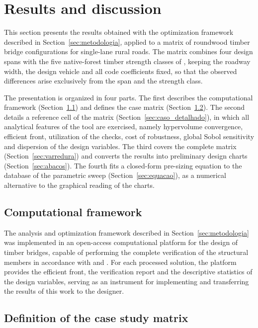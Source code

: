 \section{Results and discussion}\label{sec:resultados}

This section presents the results obtained with the optimization framework described in Section~\ref{sec:metodologia}, applied to a matrix of roundwood timber bridge configurations for single-lane rural roads.
The matrix combines four design spans with the five native-forest timber strength classes of \textcite{NBR7190-1:2022}, keeping the roadway width, the design vehicle and all code coefficients fixed, so that the observed differences arise exclusively from the span and the strength class.

The presentation is organized in four parts.
The first describes the computational framework (Section~\ref{sec:plataforma}) and defines the case matrix (Section~\ref{sec:casos}).
The second details a reference cell of the matrix (Section~\ref{sec:caso_detalhado}), in which all analytical features of the tool are exercised, namely hypervolume convergence, efficient front, utilization of the checks, cost of robustness, global Sobol sensitivity and dispersion of the design variables.
The third covers the complete matrix (Section~\ref{sec:varredura}) and converts the results into preliminary design charts (Section~\ref{sec:abacos}).
The fourth fits a closed-form pre-sizing equation to the database of the parametric sweep (Section~\ref{sec:equacao}), as a numerical alternative to the graphical reading of the charts.


\subsection{Computational framework}\label{sec:plataforma}

The analysis and optimization framework described in Section~\ref{sec:metodologia} was implemented in an open-access computational platform for the design of timber bridges, capable of performing the complete verification of the structural members in accordance with \textcite{NBR7190-1:2022} and \textcite{nbr7188} \parencite{ReliaBridge2026}.
For each processed solution, the platform provides the efficient front, the verification report and the descriptive statistics of the design variables, serving as an instrument for implementing and transferring the results of this work to the designer.

\subsection{Definition of the case study matrix}\label{sec:casos}

